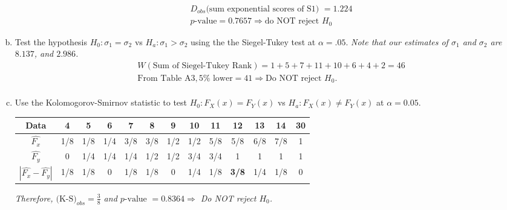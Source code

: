 \documentclass[12pt]{article}
\begin{document}
\begin{enumerate}[(a)]
\vspace{-3em}
\begin{align*}
& D_{obs} \text{(sum exponential scores of S1) } = 1.224 \\
& p\text{-value} = 0.7657 \Rightarrow \text{do NOT reject } H_0
\end{align*}

\item Test the hypothesis $H_0:\sigma_1=\sigma_2$ vs $H_a:\sigma_1>\sigma_2$ using the the Siegel-Tukey test at $\alpha=.05$.
\emph{Note that our estimates of $\sigma_1$ and $\sigma_2$ are $8.137$, and $2.986$.}
\begin{align*}
& W(\text{Sum of Siegel-Tukey Rank}) = 1+5+7+11+10+6+4+2=46 \\
& \text{From Table A3}, 5\% \text{ lower} = 41 \Rightarrow \text{Do NOT reject } H_0. \\
\end{align*}

\item Use the Kolomogorov-Smirnov statistic to test $H_0: F_X(x) = F_Y(x)$ vs $H_a: F_X(x) \neq F_Y(x)$ at $\alpha=0.05$.
\begin{table}[H] \center
\begin{tabular}{|c|c|c|c|c|c|c|c|c|c|c|c|c|} \hline
Data&4&5 &6& 7& 8& 9 &10& 11 &12&13&14&30\\ \hline
$\hat{F_x}$&1/8&1/8&1/4&3/8& 3/8&1/2&1/2&5/8&5/8&6/8&7/8&1\\ \hline
$\hat{F_y}$&0&1/4&1/4&1/4& 1/2&1/2&3/4&3/4&1&1&1&1\\ \hline
$|\hat{F_x}-\hat{F_y}|$ &1/8&1/8&0&1/8&1/8&0&1/4&1/8&\textbf{3/8}&1/4&1/8&0\\ \hline
\end{tabular}
\end{table}
\emph{ Therefore, $\text{(K-S)}_{obs}=\frac{3}{8}$ and $p\text{-value } = 0.8364 \Rightarrow$ Do NOT reject $H_0$. }
\end{enumerate}

\newpage
\end{document}
